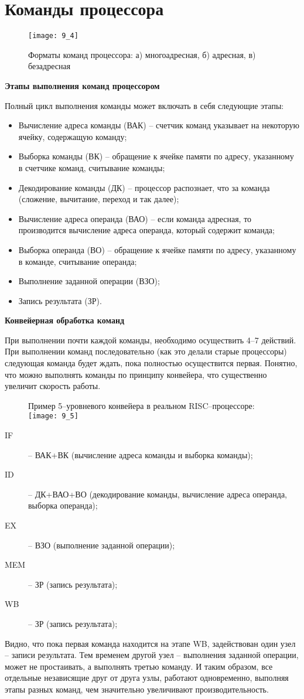 \section{Команды процессора}
\begin{figure}[h]
\centering
\texttt{[image: 9\_4]}
\caption{Форматы команд процессора: а) многоадресная, б) адресная, в) безадресная}
\end{figure}
\begin{center}
  \textbf{Этапы выполнения команд процессором}
\end{center}
Полный цикл выполнения команды может включать в себя следующие этапы:
\begin{itemize}
  \item Вычисление адреса команды (ВАК) -- счетчик команд указывает на некоторую ячейку, содержащую команду;
  \item Выборка команды (ВК) -- обращение к ячейке памяти по адресу, указанному в счетчике команд, считывание команды;
  \item Декодирование команды (ДК) -- процессор распознает, что за команда (сложение, вычитание, переход и так далее);
  \item Вычисление адреса операнда (ВАО) -- если команда адресная, то производится вычисление адреса операнда, который содержит команда;
  \item Выборка операнда (ВО) -- обращение к ячейке памяти по адресу, указанному в команде, считывание операнда;
  \item Выполнение заданной операции (ВЗО);
  \item Запись результата (ЗР).
\end{itemize}
\begin{center}
  \textbf{Конвейерная обработка команд}
\end{center}
При выполнении почти каждой команды, необходимо осуществить 4--7 действий. При выполнении команд последовательно (как это делали старые процессоры) следующая команда будет ждать, пока полностью осуществится первая. Понятно, что можно выполнять команды по принципу конвейера, что существенно увеличит скорость работы.
\begin{figure}[h]
\centering
Пример 5--уровневого конвейера в реальном RISC--процессоре:
\texttt{[image: 9\_5]}
\end{figure}
\begin{description}
  \item[IF] -- ВАК+ВК (вычисление адреса команды и выборка команды);
  \item[ID] -- ДК+ВАО+ВО (декодирование команды, вычисление адреса операнда, выборка операнда);
  \item[EX] -- ВЗО (выполнение заданной операции);
  \item[MEM] -- ЗР (запись результата);
  \item[WB] -- ЗР (запись результата);
\end{description}
Видно, что пока первая команда находится на этапе WB, задействован один узел -- записи результата. Тем временем другой узел -- выполнения заданной операции, может не простаивать, а выполнять третью команду. И таким образом, все отдельные независящие друг от друга узлы, работают одновременно, выполняя этапы разных команд, чем значительно увеличивают производительность.